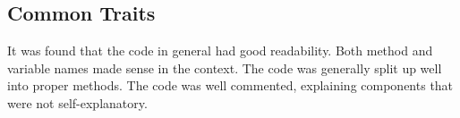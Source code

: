 \subsection{Common Traits}\label{subsec:collab_commontraits}
It was found that the code in general had good readability. Both method and variable names made sense in the context. The code was generally split up well into proper methods. The code was well commented, explaining components that were not self-explanatory.  